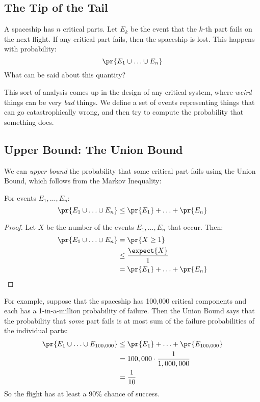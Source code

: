 \begin{editingnotes}
\section{The Tip of the Tail}

A spaceship has $n$ critical parts.  Let $E_k$ be the event that the
$k$-th part fails on the next flight.  If any critical part fails,
then the spaceship is lost.  This happens with probability:
%
\[
\pr{E_1 \cup \ldots \cup E_n}
\]
%
What can be said about this quantity?

This sort of analysis comes up in the design of any critical system,
where \textit{weird} things can be very \textit{bad} things.  We
define a set of events representing things that can go
catastrophically wrong, and then try to compute the probability that
something does.

\subsection{Upper Bound:  The Union Bound}

We can \textit{upper bound} the probability that some critical part
fails using the Union Bound, which follows from the Markov Inequality:

\begin{theorem}
\label{th:union-bound}
For events $E_1, \ldots, E_n$:
%
\[
\pr{E_1 \cup \ldots \cup E_n} \leq \pr{E_1} + \ldots + \pr{E_n}
\]
\end{theorem}

\begin{proof}
Let $X$ be the number of the events $E_1, \ldots, E_n$ that occur.
Then:
%
\begin{align*}
\pr{E_1 \cup \ldots \cup E_n}
    & = \pr{X \geq 1} \\
    & \leq \frac{\expect{X}}{1} \\
    & = \pr{E_1} + \ldots + \pr{E_n}
\end{align*}
\end{proof}

For example, suppose that the spaceship has 100,000 critical
components and each has a 1-in-a-million probability of failure.  Then
the Union Bound says that the probability that \textit{some} part
fails is at most sum of the failure probabilities of the individual
parts:
%
\begin{align*}
\pr{E_1 \cup \ldots \cup E_{100,000}}
    & \leq \pr{E_1} + \ldots + \pr{E_{100,000}} \\
    & = 100,000 \cdot \frac{1}{1,000,000} \\
    & = \frac{1}{10}
\end{align*}
%
So the flight has at least a 90\% chance of success.


\end{editingnotes}
